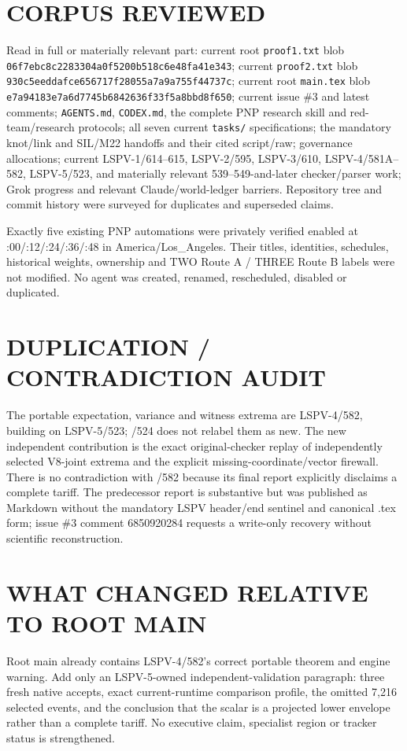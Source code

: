\documentclass[11pt]{article}
\begin{document}
\section*{CORPUS REVIEWED}
Read in full or materially relevant part: current root \texttt{proof1.txt} blob \texttt{06f7ebc8c2283304a0f5200b518c6e48fa41e343}; current \texttt{proof2.txt} blob \texttt{930c5eeddafce656717f28055a7a9a755f44737c}; current root \texttt{main.tex} blob \texttt{e7a94183e7a6d7745b6842636f33f5a8bbd8f650}; current issue \#3 and latest comments; \texttt{AGENTS.md}, \texttt{CODEX.md}, the complete PNP research skill and red-team/research protocols; all seven current \texttt{tasks/} specifications; the mandatory knot/link and SIL/M22 handoffs and their cited script/raw; governance allocations; current LSPV-1/614--615, LSPV-2/595, LSPV-3/610, LSPV-4/581A--582, LSPV-5/523, and materially relevant 539--549-and-later checker/parser work; Grok progress and relevant Claude/world-ledger barriers.  Repository tree and commit history were surveyed for duplicates and superseded claims.

Exactly five existing PNP automations were privately verified enabled at :00/:12/:24/:36/:48 in America/Los\_Angeles.  Their titles, identities, schedules, historical weights, ownership and TWO Route A / THREE Route B labels were not modified.  No agent was created, renamed, rescheduled, disabled or duplicated.

\section*{DUPLICATION / CONTRADICTION AUDIT}
The portable expectation, variance and witness extrema are LSPV-4/582, building on LSPV-5/523; /524 does not relabel them as new.  The new independent contribution is the exact original-checker replay of independently selected V8-joint extrema and the explicit missing-coordinate/vector firewall.  There is no contradiction with /582 because its final report explicitly disclaims a complete tariff.  The predecessor report is substantive but was published as Markdown without the mandatory LSPV header/end sentinel and canonical .tex form; issue \#3 comment 6850920284 requests a write-only recovery without scientific reconstruction.

\section*{WHAT CHANGED RELATIVE TO ROOT MAIN}
Root main already contains LSPV-4/582's correct portable theorem and engine warning.  Add only an LSPV-5-owned independent-validation paragraph: three fresh native accepts, exact current-runtime comparison profile, the omitted 7,216 selected events, and the conclusion that the scalar is a projected lower envelope rather than a complete tariff.  No executive claim, specialist region or tracker status is strengthened.
\end{document}
